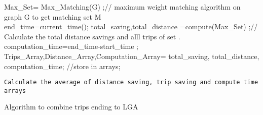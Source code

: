 \begin{algorithm}[H]
{{{{					}

	 		
	 		}

	 		Max\_Set= 	Max\_Matching(G) ;// maximum weight matching algorithm on graph G to get matching set M\\
	 		end\_time=current\_time();
	 		total\_saving,total\_distance =compute(Max\_Set) ;// Calculate the total distance savings and alll trips of set .\\
	 		computation\_time=end\_time-start\_time ;
		Trips\_Array,Distance\_Array,Computation\_Array= total\_saving, total\_distance, computation\_time; //store in arrays;\\


	
	 	
	 	
	 }
	\texttt{Calculate the average of distance saving, trip saving and compute time arrays}

 }
 \caption{Algorithm to combine trips ending to   LGA}
\end{algorithm}

